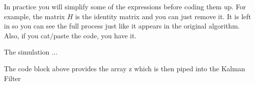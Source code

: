 In practice you will simplify some of the expressions before coding them
up. For example, the matrix \(H\) is the identity matrix and you can
just remove it. It is left in so you can see the full process just like
it appears in the original algorithm. Also, if you cat/paste the code,
you have it.

The simulation ...

\begin{Shaded}
\begin{Highlighting}[]
\OperatorTok{=} \OperatorTok{:}
\OperatorTok{=}\OperatorTok{,}\OperatorTok{,} \NormalTok{)}
\OperatorTok{=}\OperatorTok{,}\OperatorTok{,} \NormalTok{)}
\NormalTok{  x\_sim[}\OperatorTok{:,}\NormalTok{k] }\OperatorTok{=}\OperatorTok{*}\NormalTok{ x\_sim[}\OperatorTok{:,}\OperatorTok{{-}}\NormalTok{]) }\OperatorTok{+}\NormalTok{ G[}\OperatorTok{:,}\NormalTok{k] }\OperatorTok{+}
\NormalTok{  z\_sim[}\OperatorTok{:,}\NormalTok{k] }\OperatorTok{=}\OperatorTok{*}\NormalTok{ x\_sim[}\OperatorTok{:,}\NormalTok{ k]) }\OperatorTok{+}
\end{Highlighting}
\end{Shaded}

The code block above provides the array z which is then piped into the
Kalman Filter

\begin{Shaded}
\begin{Highlighting}[]
\OperatorTok{=} \OperatorTok{:}
\OperatorTok{=}\OperatorTok{*}\NormalTok{ x\_estimate[}\OperatorTok{:,}\OperatorTok{{-}}\NormalTok{] }\OperatorTok{+}\NormalTok{ G[}\OperatorTok{:,}\NormalTok{k]}
\OperatorTok{=}\OperatorTok{*}\OperatorTok{*}\OperatorTok{+}
\OperatorTok{=}\NormalTok{ z\_sim[}\OperatorTok{:,}\NormalTok{k] }\OperatorTok{{-}}\OperatorTok{*}
\OperatorTok{=}\OperatorTok{*}\OperatorTok{*}\OperatorTok{+}
\OperatorTok{=}\OperatorTok{*}\OperatorTok{*}
\NormalTok{  x\_estimate[}\OperatorTok{:,}\NormalTok{k] }\OperatorTok{=}\OperatorTok{+}\OperatorTok{*}
\OperatorTok{=}\OperatorTok{{-}}\OperatorTok{*}\OperatorTok{*}
\end{Highlighting}
\end{Shaded}

